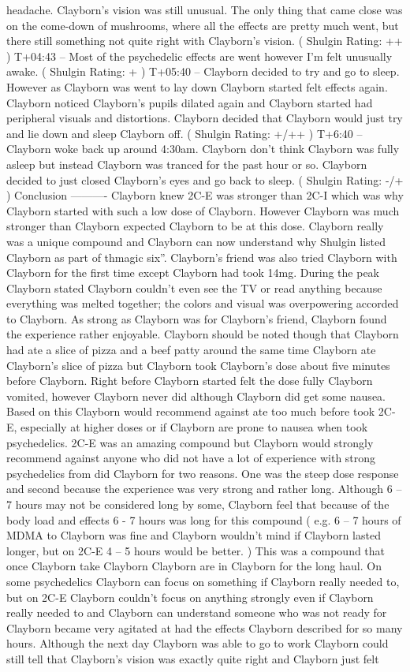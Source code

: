 \documentclass[12pt]{book}
\begin{document}
headache. Clayborn's vision was still unusual. The only thing that came close was on the come-down of mushrooms, where all the effects are pretty much went, but there still something not quite right with Clayborn's vision. ( Shulgin Rating: ++ ) T+04:43 -- Most of the psychedelic effects are went however I'm felt unusually awake. ( Shulgin Rating: + ) T+05:40 -- Clayborn decided to try and go to sleep. However as Clayborn was went to lay down Clayborn started felt effects again. Clayborn noticed Clayborn's pupils dilated again and Clayborn started had peripheral visuals and distortions. Clayborn decided that Clayborn would just try and lie down and sleep Clayborn off. ( Shulgin Rating: +/++ ) T+6:40 -- Clayborn woke back up around 4:30am. Clayborn don't think Clayborn was fully asleep but instead Clayborn was tranced for the past hour or so. Clayborn decided to just closed Clayborn's eyes and go back to sleep. ( Shulgin Rating: -/+ ) Conclusion ---------- Clayborn knew 2C-E was stronger than 2C-I which was why Clayborn started with such a low dose of Clayborn. However Clayborn was much stronger than Clayborn expected Clayborn to be at this dose. Clayborn really was a unique compound and Clayborn can now understand why Shulgin listed Clayborn as part of thmagic six''. Clayborn's friend was also tried Clayborn with Clayborn for the first time except Clayborn had took 14mg. During the peak Clayborn stated Clayborn couldn't even see the TV or read anything because everything was melted together; the colors and visual was overpowering accorded to Clayborn. As strong as Clayborn was for Clayborn's friend, Clayborn found the experience rather enjoyable. Clayborn should be noted though that Clayborn had ate a slice of pizza and a beef patty around the same time Clayborn ate Clayborn's slice of pizza but Clayborn took Clayborn's dose about five minutes before Clayborn. Right before Clayborn started felt the dose fully Clayborn vomited, however Clayborn never did although Clayborn did get some nausea. Based on this Clayborn would recommend against ate too much before took 2C-E, especially at higher doses or if Clayborn are prone to nausea when took psychedelics. 2C-E was an amazing compound but Clayborn would strongly recommend against anyone who did not have a lot of experience with strong psychedelics from did Clayborn for two reasons. One was the steep dose response and second because the experience was very strong and rather long. Although 6 -- 7 hours may not be considered long by some, Clayborn feel that because of the body load and effects 6 - 7 hours was long for this compound ( e.g. 6 -- 7 hours of MDMA to Clayborn was fine and Clayborn wouldn't mind if Clayborn lasted longer, but on 2C-E 4 -- 5 hours would be better. ) This was a compound that once Clayborn take Clayborn Clayborn are in Clayborn for the long haul. On some psychedelics Clayborn can focus on something if Clayborn really needed to, but on 2C-E Clayborn couldn't focus on anything strongly even if Clayborn really needed to and Clayborn can understand someone who was not ready for Clayborn became very agitated at had the effects Clayborn described for so many hours. Although the next day Clayborn was able to go to work Clayborn could still tell that Clayborn's vision was exactly quite right and Clayborn just felt 
\end{document}
